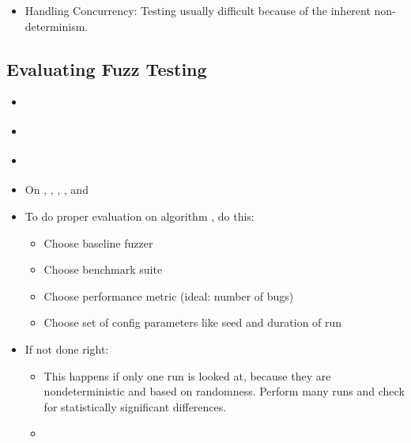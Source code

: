 \documentclass{article}
\begin{document}
\begin{itemize}
\begin{itemize}
          \item Handling Concurrency: Testing usually difficult because of the inherent non-determinism. \cite{ReviewThreeDecades}
        \end{itemize}
\end{itemize}

\subsection{Evaluating Fuzz Testing}
\begin{itemize}
  \item \cite{EvaluatingFuzzTesting}
  \item {}\cite{EvaluatingFuzzTesting}
  \item {}\cite{EvaluatingFuzzTesting}
  \item On , , , , and 
  \item To do proper evaluation on algorithm , do this:
        \begin{itemize}
          \item Choose baseline fuzzer 
          \item Choose benchmark suite
          \item Choose performance metric (ideal: number of bugs)
          \item Choose set of config parameters like seed and duration of run
        \end{itemize}
  \item If not done right:
        \begin{itemize}
          \item {}\cite{EvaluatingFuzzTesting} This happens if only one run is looked at, because they are nondeterministic and based on randomness. Perform many runs and check for statistically significant differences.
          \item {}\cite{EvaluatingFuzzTesting}

\end{itemize}
\end{itemize}
\end{document}
